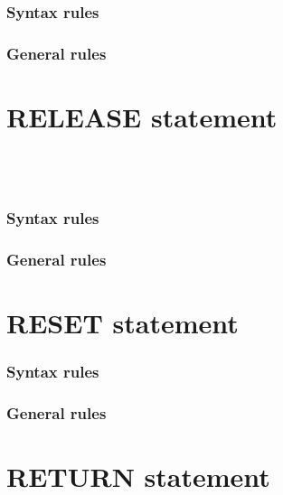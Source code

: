 \subsubsection{Syntax rules}

\subsubsection{General rules}

\section{RELEASE statement}

\begin{syntax}
   \identifier
  \begin{0-1}
    \begin{1=}
      \identifier \\
      \literal \\
    \end{1=}
  \end{0-1}
\end{syntax}

\subsubsection{Syntax rules}

\subsubsection{General rules}

\section{RESET statement}

\begin{syntax}[\miscextcolour]
   
\end{syntax}

\subsubsection{Syntax rules}

\subsubsection{General rules}

\section{RETURN statement}

